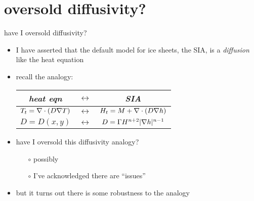 
\section{oversold diffusivity?}

\begin{frame}{have I oversold diffusivity?} 

\begin{itemize}
\item I have asserted that the default model for ice sheets, the SIA, is a \emph{diffusion} like the heat equation
\item recall the analogy:

\bigskip
\begin{tabular}{ccc}
\emph{heat eqn} & $\leftrightarrow$ & \emph{SIA} \\ \hline
$T_t = \nabla\cdot\left(D \nabla T\right)$ & $\leftrightarrow$ & $H_t = M + \nabla\cdot\left(D \nabla h\right)$ \\
$D=D(x,y)$ & $\leftrightarrow$ & $D = \Gamma H^{n+2} |\nabla h|^{n-1}$ \\
\end{tabular}

\bigskip
\item have I oversold this diffusivity analogy?
  \begin{itemize}
  \item[$\circ$] possibly
  \item[$\circ$] I've acknowledged there are ``issues''
  \end{itemize}
\item but it turns out there is some robustness to the analogy
\end{itemize}
\end{frame}



